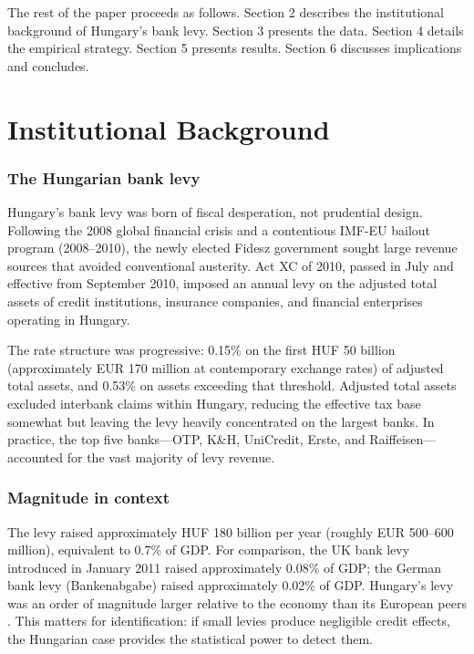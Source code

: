 \documentclass[12pt]{article}
\begin{document}
The rest of the paper proceeds as follows. Section 2 describes the institutional background of Hungary's bank levy. Section 3 presents the data. Section 4 details the empirical strategy. Section 5 presents results. Section 6 discusses implications and concludes.


\section{Institutional Background}

\subsubsection*{The Hungarian bank levy} Hungary's bank levy was born of fiscal desperation, not prudential design. Following the 2008 global financial crisis and a contentious IMF-EU bailout program (2008--2010), the newly elected Fidesz government sought large revenue sources that avoided conventional austerity. Act XC of 2010, passed in July and effective from September 2010, imposed an annual levy on the adjusted total assets of credit institutions, insurance companies, and financial enterprises operating in Hungary.

The rate structure was progressive: 0.15\% on the first HUF 50 billion (approximately EUR 170 million at contemporary exchange rates) of adjusted total assets, and 0.53\% on assets exceeding that threshold. Adjusted total assets excluded interbank claims within Hungary, reducing the effective tax base somewhat but leaving the levy heavily concentrated on the largest banks. In practice, the top five banks---OTP, K\&H, UniCredit, Erste, and Raiffeisen---accounted for the vast majority of levy revenue.

\subsubsection*{Magnitude in context} The levy raised approximately HUF 180 billion per year (roughly EUR 500--600 million), equivalent to 0.7\% of GDP. For comparison, the UK bank levy introduced in January 2011 raised approximately 0.08\% of GDP; the German bank levy (Bankenabgabe) raised approximately 0.02\% of GDP. Hungary's levy was an order of magnitude larger relative to the economy than its European peers \citep{devereux2019}. This matters for identification: if small levies produce negligible credit effects, the Hungarian case provides the statistical power to detect them.
\end{document}
